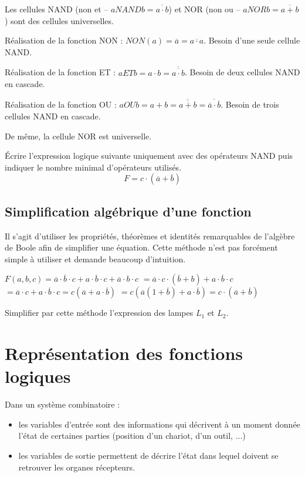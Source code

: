 \begin{exemple}
Les cellules NAND (non et -- $a NAND b = \overline{a\cdot b}$) et NOR (non ou -- $a NOR b = \overline{a + b}$) sont des cellules universelles. 

Réalisation de la fonction NON : $ NON(a) = \overline{a} = \overline{a\cdot a}$. Besoin d'une seule cellule NAND. 
 
Réalisation de la fonction ET : $ a ET b = a\cdot b= \overline{\overline{a\cdot b}} $. Besoin de deux cellules NAND en cascade. 

Réalisation de la fonction OU : $ a OU b = a+ b= \overline{\overline{a+b}}= \overline{\overline{a}\cdot\overline{b}} $. Besoin de trois cellules NAND en cascade. 

De même, la cellule NOR est universelle.
\end{exemple}

\begin{exemple}
Écrire l'expression logique suivante uniquement avec des opérateurs NAND puis indiquer le nombre minimal d'opérateurs utilisés.
$$
F=c\cdot (\overline{a}+\overline{b})
$$
\end{exemple}

\subsection{Simplification algébrique d'une fonction}
Il s'agit d'utiliser les propriétés, théorèmes et identités remarquables de l'algèbre de Boole afin de simplifier une équation. Cette méthode n'est pas forcément simple à utiliser et demande beaucoup d'intuition.

\begin{exemple}
$F(a,b,c) = \overline{a}\cdot \overline{b} \cdot c + a \cdot \overline{b} \cdot c + \overline{a}\cdot b \cdot c $
$= \overline{a}\cdot c \cdot (\overline{b}+b) + a\cdot \overline{b}\cdot c $
$= \overline{a}\cdot c + a\cdot \overline{b}\cdot c = c(\overline{a}+a\cdot \overline{b}) $
$= c\left(\overline{a}(1+\overline{b}) + a \cdot \overline{b}\right) = c\cdot (\overline{a}+\overline{b})$
\end{exemple}

\begin{exemple}
Simplifier par cette méthode l'expression des lampes $L_1$ et $L_2$. 
\end{exemple}




\section{Représentation des fonctions logiques}
Dans un système combinatoire : 
\begin{itemize}
\item les variables d'entrée sont des informations qui décrivent à un moment donnée l'état de certaines parties (position d'un chariot, d'un outil, ...)
\item les variables de sortie permettent de décrire l'état dans lequel doivent se retrouver les organes récepteurs. 
\end{itemize}

